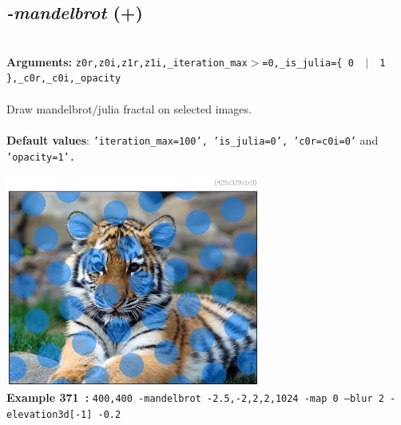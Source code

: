\documentclass[a4paper,11pt,twoside]{book}
\begin{document}
\subsection{\emph{-mandelbrot} (+)}\vspace*{-0.5em}
~\\\textbf{Arguments: } 
{\small \texttt{z0r,z0i,z1r,z1i,\_iteration\_max$>$=0,\_is\_julia=\{ 0 ~$|$~ 1 \},\_c0r,\_c0i,\_opacity}}\\~\\
Draw mandelbrot/julia fractal on selected images.
~\\~\\\textbf{Default values}: {\small \texttt{'iteration\_max=100', 'is\_julia=0', 'c0r=c0i=0'} and \texttt{'opacity=1'.}}
\begin{center}\includegraphics[keepaspectratio=true,height=7cm,width=\textwidth]{img/gmic_def371.jpg}\\
{\footnotesize \textbf{Example 371~:} \texttt{400,400 -mandelbrot -2.5,-2,2,2,1024 -map 0 --blur 2 -elevation3d[-1] -0.2}}
\end{center}
\end{document}

